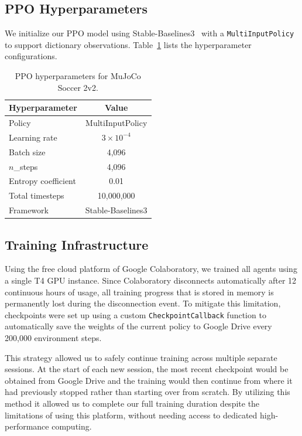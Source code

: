\subsection{PPO Hyperparameters}

We initialize our PPO model using Stable-Baselines3~\citep{raffin2021stablebaselines3} with a \texttt{MultiInputPolicy} to support dictionary observations. Table~\ref{tab:ppo_hyperparams} lists the hyperparameter configurations.

\begin{table}[!ht]
    \centering
    \caption{PPO hyperparameters for MuJoCo Soccer 2v2.}
    \label{tab:ppo_hyperparams}
    \begin{tabular}{lc}
        \toprule
        \textbf{Hyperparameter} & \textbf{Value} \\
        \midrule
        Policy              & MultiInputPolicy \\
        Learning rate       & $3 \times 10^{-4}$ \\
        Batch size          & 4,096 \\
        $n$\_steps          & 4,096 \\
        Entropy coefficient & 0.01 \\
        Total timesteps     & 10,000,000 \\
        Framework           & Stable-Baselines3 \\
        \bottomrule
    \end{tabular}
\end{table}

\subsection{Training Infrastructure}

Using the free cloud platform of Google Colaboratory, we trained all agents using a single T4 GPU instance. Since Colaboratory disconnects automatically after 12 continuous hours of usage, all training progress that is stored in memory is permanently lost during the disconnection event. To mitigate this limitation, checkpoints were set up using a custom \texttt{CheckpointCallback} function to automatically save the weights of the current policy to Google Drive every 200,000 environment steps.

This strategy allowed us to safely continue training across multiple separate sessions. At the start of each new session, the most recent checkpoint would be obtained from Google Drive and the training would then continue from where it had previously stopped rather than starting over from scratch. By utilizing this method it allowed us to complete our full training duration despite the limitations of using this platform, without needing access to dedicated high-performance computing.

